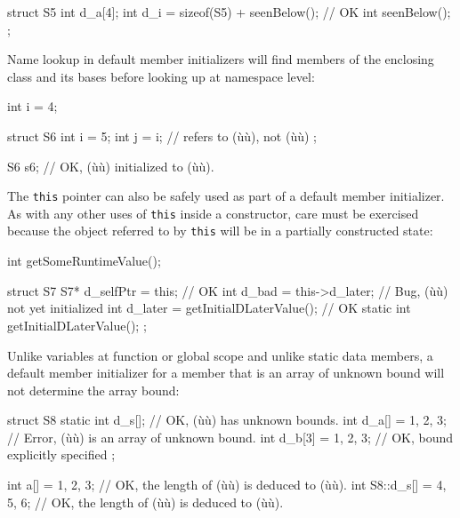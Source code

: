 \begin{emcppslisting}
struct S5
{
    int d_a[4];
    int d_i = sizeof(S5) + seenBelow();  // OK
    int seenBelow();
};
\end{emcppslisting}
    

Name lookup in default member initializers will find members of the
enclosing class and its bases before looking up at namespace level:

\begin{emcppslisting}
int i = 4;

struct S6
{
    int i = 5;
    int j = i;  // refers to (ù{}ù), not (ù{}ù)
};

S6 s6;  // OK, (ù{}ù) initialized to (ù{}ù).
\end{emcppslisting}
    

The \lstinline!this! pointer can also be safely used as part of a default
member initializer. As with any other uses of \lstinline!this! inside a
constructor, care must be exercised because the object referred to by
\lstinline!this! will be in a partially constructed state:

\begin{emcppslisting}
int getSomeRuntimeValue();

struct S7
{
    S7* d_selfPtr = this;                   // OK
    int d_bad = this->d_later;              // Bug, (ù{}ù) not yet initialized
    int d_later = getInitialDLaterValue();  // OK
    static int getInitialDLaterValue();
};
\end{emcppslisting}
    

Unlike variables at function or global scope and unlike static data
members, a default member initializer for a member that is an array of
unknown bound will not determine the array bound:

\begin{emcppslisting}
struct S8
{
    static int d_s[];        // OK, (ù{}ù) has unknown bounds.
    int d_a[] = {1, 2, 3};   // Error, (ù{}ù) is an array of unknown bound.
    int d_b[3] = {1, 2, 3};  // OK, bound explicitly specified
};

int a[] = {1, 2, 3};         // OK, the length of (ù{}ù) is deduced to (ù{}ù).
int S8::d_s[] = {4, 5, 6};   // OK, the length of (ù{}ù) is deduced to (ù{}ù).
\end{emcppslisting}
    


